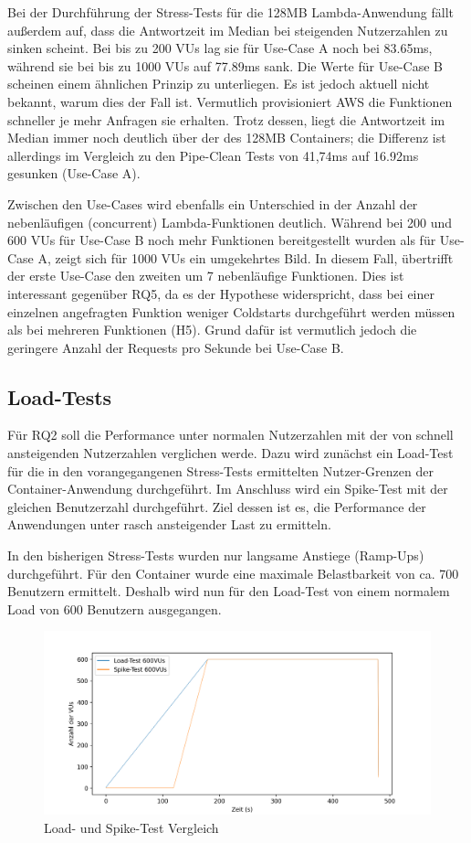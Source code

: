 Bei der Durchführung der Stress-Tests für die 128MB Lambda-Anwendung fällt außerdem auf, dass die Antwortzeit im Median bei steigenden Nutzerzahlen zu sinken scheint. Bei bis zu 200 VUs lag sie für Use-Case A noch bei 83.65ms, während sie bei bis zu 1000 VUs auf 77.89ms sank. Die Werte für Use-Case B scheinen einem ähnlichen Prinzip zu unterliegen. Es ist jedoch aktuell nicht bekannt, warum dies der Fall ist. Vermutlich provisioniert AWS die Funktionen schneller je mehr Anfragen sie erhalten. Trotz dessen, liegt die Antwortzeit im Median immer noch deutlich über der des 128MB Containers; die Differenz ist allerdings im Vergleich zu den Pipe-Clean Tests von 41,74ms auf 16.92ms gesunken (Use-Case A).

Zwischen den Use-Cases wird ebenfalls ein Unterschied in der Anzahl der nebenläufigen (concurrent) Lambda-Funktionen deutlich. Während bei 200 und 600 VUs für Use-Case B noch mehr Funktionen bereitgestellt wurden als für Use-Case A, zeigt sich für 1000 VUs ein umgekehrtes Bild. In diesem Fall, übertrifft der erste Use-Case den zweiten um 7 nebenläufige Funktionen. Dies ist interessant gegenüber RQ5, da es der Hypothese widerspricht, dass bei einer einzelnen angefragten Funktion weniger Coldstarts durchgeführt werden müssen als bei mehreren Funktionen (H5). Grund dafür ist vermutlich jedoch die geringere Anzahl der Requests pro Sekunde bei Use-Case B. 

\subsection{Load-Tests}
Für RQ2 soll die Performance unter normalen Nutzerzahlen mit der von schnell ansteigenden Nutzerzahlen verglichen werde. Dazu wird zunächst ein Load-Test für die in den vorangegangenen Stress-Tests ermittelten Nutzer-Grenzen der Container-Anwendung durchgeführt. Im Anschluss wird ein Spike-Test mit der gleichen Benutzerzahl durchgeführt. Ziel dessen ist es, die Performance der Anwendungen unter rasch ansteigender Last zu ermitteln. 

In den bisherigen Stress-Tests wurden nur langsame Anstiege (Ramp-Ups) durchgeführt. Für den Container wurde eine maximale Belastbarkeit von ca. 700 Benutzern ermittelt. Deshalb wird nun für den Load-Test von einem normalem Load von 600 Benutzern ausgegangen. 

\begin{figure}[H]
    \includegraphics[width=\textwidth]{img/load600-vs-spike600.png}
    \caption[Load- und Spike-Test Vergleich]{Load- und Spike-Test Vergleich}
    \label{fig:load600-vs-spike600}
\end{figure}

